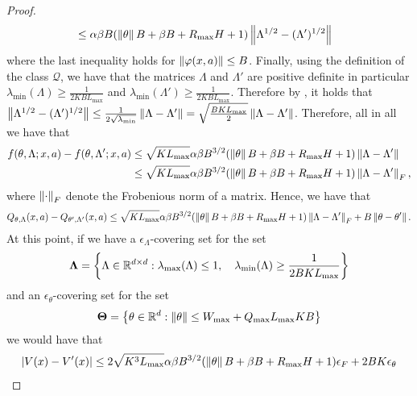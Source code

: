\begin{proof}
\begin{align*}
        &\leq \alpha \beta B (\left\|\theta\right\| B + \beta B +R_{\max} H + 1) \left\|\Lambda^{1/2} - (\Lambda')^{1/2}\right\| 
    \end{align*}
    where the last inequality holds for $\left\|\varphi (x,a)\right\| \leq B$. Finally, using the definition of the class $\mathcal{Q}$, we have that the matrices $\Lambda$ and $\Lambda'$ are positive definite in particular $\lambda_{\min}(\Lambda) \geq \frac{1}{2KBL_{\max}}$ and $\lambda_{\min}(\Lambda') \geq \frac{1}{2KBL_{\max}}$. 
    Therefore by \cite[Lemma 17]{cassel2024warmupfree}, 
    it holds that $\left\|\Lambda^{1/2} - (\Lambda')^{1/2}\right\| \leq \frac{1}{2\sqrt{\lambda_{\min}}}\left\|\Lambda - \Lambda'\right\| = \sqrt{\frac{B K L_{\max}}{2}} \left\|\Lambda - \Lambda'\right\|$. 
    Therefore, all in all we have that
    \begin{align*}
        f(\theta,\Lambda;x,a) - f(\theta,\Lambda';x,a)
        &\leq \sqrt{K L_{\max}}\alpha\beta B^{3/2} (\left\|\theta\right\| B
        + \beta B +R_{\max} H + 1) \left\|\Lambda - \Lambda'\right\| \\
        &\leq \sqrt{K L_{\max}}\alpha\beta B^{3/2} (\left\|\theta\right\| B
        + \beta B +R_{\max} H + 1) \left\|\Lambda - \Lambda'\right\|_F,
    \end{align*}
    where $\left\|\cdot\right\|_F$ denote the Frobenious norm of a matrix. Hence, we have that
    \begin{align*}
        Q_{\theta,\Lambda}(x,a) - Q_{\theta',\Lambda'}(x,a) \leq 
        \sqrt{K L_{\max}}\alpha\beta B^{3/2} (\left\|\theta\right\| B + \beta B +R_{\max} H + 1)
         \left\|\Lambda - \Lambda'\right\|_F + B \left\|\theta - \theta'\right\|.
    \end{align*}
    At this point, if we have a $\epsilon_{\Lambda}$-covering set for the set
    \begin{equation*}
        \mathbf{\Lambda} = \left\{{\Lambda \in \mathbb{R}^{d\times d} : \lambda_{\max}(\Lambda) \leq 1, ~~~\lambda_{\min}(\Lambda) \geq \frac{1}{2BKL_{\max}}}\right\}
    \end{equation*}
    and an $\epsilon_\theta$-covering set for the set
    \begin{equation*}
        \mathbf{\Theta} = \left\{{\theta \in \mathbb{R}^d: \left\|\theta\right\| \leq W_{\max} + Q_{\max}L_{\max}K B}\right\}
    \end{equation*}
    we would have that
    \begin{align*}
        \abs{V(x) - V'(x)} &\leq 2\sqrt{ K^3 L_{\max}}\alpha\beta B^{3/2} (\norm{\theta} B + \beta B +\RMAX H + 1) \epsilon_F + 2 B K \epsilon_\theta \\

\end{align*}
\end{proof}
